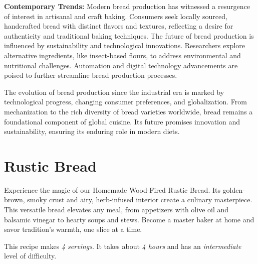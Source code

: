 \textbf{Contemporary Trends:} Modern bread production has witnessed a resurgence of interest in artisanal and craft baking. Consumers seek locally sourced, handcrafted bread with distinct flavors and textures, reflecting a desire for authenticity and traditional baking techniques. The future of bread production is influenced by sustainability and technological innovations. Researchers explore alternative ingredients, like insect-based flours, to address environmental and nutritional challenges. Automation and digital technology advancements are poised to further streamline bread production processes.

The evolution of bread production since the industrial era is marked by technological progress, changing consumer preferences, and globalization. From mechanization to the rich diversity of bread varieties worldwide, bread remains a foundational component of global cuisine. Its future promises innovation and sustainability, ensuring its enduring role in modern diets.

\clearpage
\section{Rustic Bread}
\label{rusticbread}
Experience the magic of our Homemade Wood-Fired Rustic Bread. Its golden-brown, smoky crust and airy, herb-infused interior create a culinary masterpiece. This versatile bread elevates any meal, from appetizers with olive oil and balsamic vinegar to hearty soups and stews. Become a master baker at home and savor tradition's warmth, one slice at a time.

This recipe makes \emph{4 servings}. It takes about \emph{4 hours} and has an \emph{intermediate} level of difficulty. 

